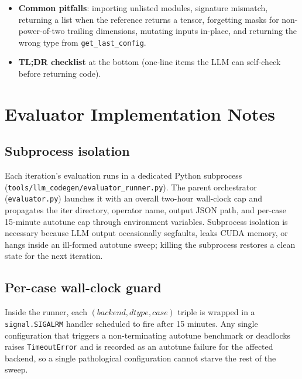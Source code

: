 \documentclass[11pt]{article}
\begin{document}
\begin{itemize}[leftmargin=*]
    Python-level cache keyed on tensor identity, version, or
    storage-pointer that returns a stored output instead of executing
    the kernel will be caught by the harness either as a verify
    failure (because the cache returns a stale output for the
    regenerated inputs) or as an over-roofline outlier (because the
    cached path takes near-zero time). The guide spells out this
    contract explicitly with the rationale that any kernel-launch
    bypass is treated as a reward-hacking attempt.
    \item \textbf{Common pitfalls}: importing unlisted modules, signature
    mismatch, returning a list when the reference returns a tensor,
    forgetting masks for non-power-of-two trailing dimensions, mutating
    inputs in-place, and returning the wrong type from
    \texttt{get\_last\_config}.
    \item \textbf{TL;DR checklist} at the bottom (one-line items the LLM
    can self-check before returning code).
\end{itemize}

\section{Evaluator Implementation Notes}

\subsection{Subprocess isolation}

Each iteration's evaluation runs in a dedicated Python subprocess
(\texttt{tools/llm\_codegen/evaluator\_runner.py}). The parent
orchestrator (\texttt{evaluator.py}) launches it with an overall
two-hour wall-clock cap and propagates the iter directory, operator
name, output JSON path, and per-case 15-minute autotune cap through
environment variables. Subprocess isolation is necessary because LLM
output occasionally segfaults, leaks CUDA memory, or hangs inside an
ill-formed autotune sweep; killing the subprocess restores a clean
state for the next iteration.

\subsection{Per-case wall-clock guard}

Inside the runner, each $(backend, dtype, case)$ triple is wrapped in
a \texttt{signal.SIGALRM} handler scheduled to fire after 15 minutes.
Any single configuration that triggers a non-terminating autotune
benchmark or deadlocks raises \texttt{TimeoutError} and is recorded
as an autotune failure for the affected backend, so a single
pathological configuration cannot starve the rest of the sweep.
\end{document}
